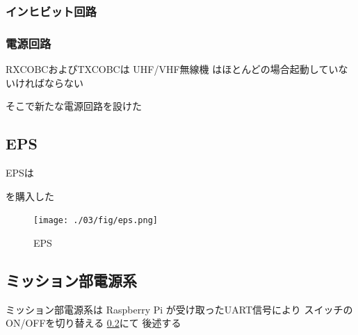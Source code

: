 \subsubsection{インヒビット回路}


\subsubsection{電源回路}
RXCOBCおよびTXCOBCは
UHF/VHF無線機
はほとんどの場合起動していないければならない

そこで新たな電源回路を設けた



\subsection{EPS}
EPSは

を購入した
\begin{figure}[htbp]
	\begin{center}
		\texttt{[image: ./03/fig/eps.png]}
		\caption{EPS}
		\label{eps}
	\end{center}
\end{figure}

\subsection{ミッション部電源系}
ミッション部電源系は
Raspberry Pi
が受け取ったUART信号により
スイッチのON/OFFを切り替える
\ref{}にて
後述する


